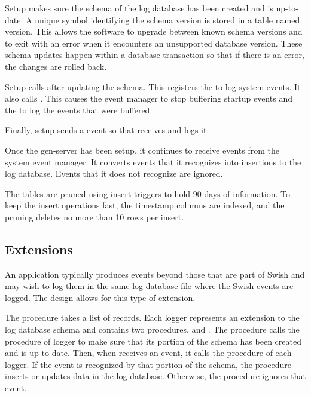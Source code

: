 Setup makes sure the schema of the log database has been created and
is up-to-date. A unique symbol identifying the schema version is
stored in a table named version. This allows the software to upgrade
between known schema versions and to exit with an error when it
encounters an unsupported database version. These schema updates
happen within a database transaction so that if there is an error, the
changes are rolled back.

Setup calls  after updating the
schema. This registers the  to log system events. It
also calls . This causes the event
manager to stop buffering startup events and the  to
log the events that were buffered.

Finally, setup sends a  event so that
 receives and logs it.

Once the  gen-server has been setup, it continues to
receive events from the system event manager. It converts events that
it recognizes into insertions to the log database. Events that it does
not recognize are ignored.

The tables are pruned using insert triggers to hold 90 days of
information. To keep the insert operations fast, the timestamp columns
are indexed, and the pruning deletes no more than 10 rows per insert.

\subsection {Extensions}

An application typically produces events beyond those that are part of
Swish and may wish to log them in the same log database file where the
Swish events are logged. The  design allows for this
type of extension.

The  procedure takes a list of
 records. Each logger represents an extension
to the log database schema and contains two procedures, 
and . The  procedure calls the
 procedure of logger to make sure that its portion of
the schema has been created and is up-to-date. Then, when
 receives an event, it calls the  procedure
of each logger. If the event is recognized by that portion of the
schema, the  procedure inserts or updates data in the log
database. Otherwise, the procedure ignores that event.

